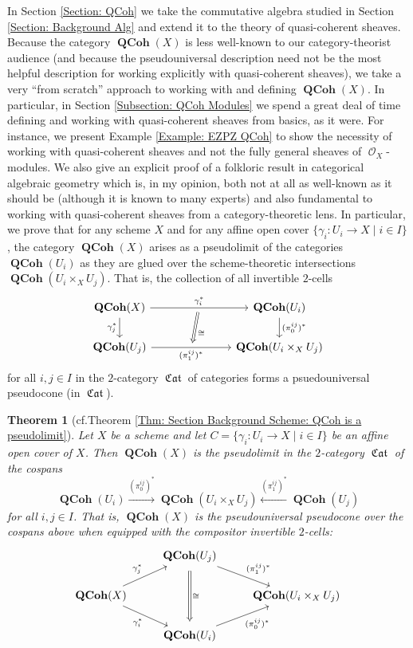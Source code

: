 \documentclass{amsart}
\newtheorem{thmx}{Theorem}
\theoremstyle{definition}
\DeclareMathOperator{\Ocal}{\mathcal{O}}
\DeclareMathOperator{\fCat}{\mathfrak{Cat}}
\DeclareMathOperator{\QCoh}{\mathbf{QCoh}}
\numberwithin{equation}{subsection}
\begin{document}
In Section \ref{Section: QCoh} we take the commutative algebra studied in Section \ref{Section: Background Alg} and extend it to the theory of quasi-coherent sheaves. Because the category $\QCoh(X)$ is less well-known to our category-theorist audience (and because the pseudouniversal description need not be the most helpful description for working explicitly with quasi-coherent sheaves), we take a very ``from scratch'' approach to working with and defining $\QCoh(X)$. In particular, in Section \ref{Subsection: QCoh Modules} we spend a great deal of time defining and working with quasi-coherent sheaves from basics, as it were. For instance, we present Example \ref{Example: EZPZ QCoh} to show the necessity of working with quasi-coherent sheaves and not the fully general sheaves of $\Ocal_X$-modules. We also give an explicit proof of a folkloric result in categorical algebraic geometry which is, in my opinion, both not at all as well-known as it should be (although it is known to many experts) and also fundamental to working with quasi-coherent sheaves from a category-theoretic lens. In particular, we prove that for any scheme $X$ and for any affine open cover $\lbrace \gamma_i:U_i \to X \; | \; i\in I\rbrace$, the category $\QCoh(X)$ arises as a pseudolimit of the categories $\QCoh(U_i)$ as they are glued over the scheme-theoretic intersections $\QCoh(U_i \times_X U_j)$. That is, the collection of all invertible $2$-cells 
\[
\begin{tikzcd}
\QCoh(X) \ar[rrr, ""{name = U}]{}{\gamma_i^{\ast}} \ar[d,swap]{}{\gamma_j^{\ast}} & & & \QCoh(U_i) \ar[d]{}{(\pi_0^{ij})^{\ast}} \\
\QCoh(U_j) \ar[rrr, swap, ""{name = D}]{}{(\pi_1^{ij})^{\ast}} & & & \QCoh(U_i \times_X U_j)
\ar[from = U, to = D, Rightarrow, shorten <= 4pt, shorten >= 4pt]{}{\cong}
\end{tikzcd}
\]
for all $i, j \in I$ in the $2$-category $\fCat$ of categories forms a psuedouniversal pseudocone (in $\fCat$).
\begin{thmx}[{cf.\@ Theorem \ref{Thm: Section Background Scheme: QCoh is a pseudolimit}}]
Let $X$ be a scheme and let $C = \lbrace \gamma_i:U_i \to X \; | \; i \in I \rbrace$ be an affine open cover of $X$. Then $\QCoh(X)$ is the pseudolimit in the $2$-category $\fCat$ of the cospans 
\[
\QCoh(U_i) \xrightarrow{(\pi_0^{ij})^{\ast}} \QCoh(U_i \times_X U_j) \xleftarrow{(\pi_1^{ij})^{\ast}} \QCoh(U_j)
\]
for all $i, j \in I$. That is, $\QCoh(X)$ is the pseudouniversal pseudocone over the cospans above when equipped with the compositor invertible $2$-cells:
\[
\begin{tikzcd}
	& \QCoh(U_j) \ar[dr]{}{(\pi_1^{ij})^{\ast}} \\
	\QCoh(X) \ar[ur]{}{\gamma_j^{\ast}} \ar[dr, swap]{}{\gamma_i^{\ast}} &	& \QCoh(U_i \times_X U_j) \\
	& \QCoh(U_i) \ar[ur, swap]{}{(\pi_0^{ij})^{\ast}}
	\ar[from = 1-2, to = 3-2, Rightarrow, shorten <= 4pt, shorten >= 4pt]{}{\cong}
\end{tikzcd}
\]
\end{thmx}
\end{document}
